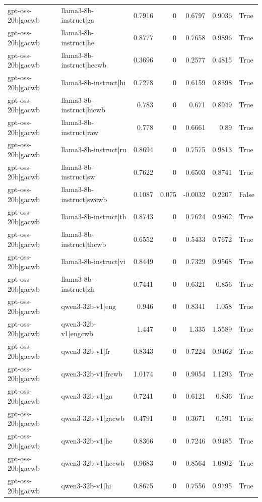 \begin{table}
\begin{tabular}{l l r r r r l}
gpt-oss-20b|gacwb & llama3-8b-instruct|ga & 0.7916 & 0 & 0.6797 & 0.9036 & True \\
gpt-oss-20b|gacwb & llama3-8b-instruct|he & 0.8777 & 0 & 0.7658 & 0.9896 & True \\
gpt-oss-20b|gacwb & llama3-8b-instruct|hecwb & 0.3696 & 0 & 0.2577 & 0.4815 & True \\
gpt-oss-20b|gacwb & llama3-8b-instruct|hi & 0.7278 & 0 & 0.6159 & 0.8398 & True \\
gpt-oss-20b|gacwb & llama3-8b-instruct|hicwb & 0.783 & 0 & 0.671 & 0.8949 & True \\
gpt-oss-20b|gacwb & llama3-8b-instruct|raw & 0.778 & 0 & 0.6661 & 0.89 & True \\
gpt-oss-20b|gacwb & llama3-8b-instruct|ru & 0.8694 & 0 & 0.7575 & 0.9813 & True \\
gpt-oss-20b|gacwb & llama3-8b-instruct|sw & 0.7622 & 0 & 0.6503 & 0.8741 & True \\
gpt-oss-20b|gacwb & llama3-8b-instruct|swcwb & 0.1087 & 0.075 & -0.0032 & 0.2207 & False \\
gpt-oss-20b|gacwb & llama3-8b-instruct|th & 0.8743 & 0 & 0.7624 & 0.9862 & True \\
gpt-oss-20b|gacwb & llama3-8b-instruct|thcwb & 0.6552 & 0 & 0.5433 & 0.7672 & True \\
gpt-oss-20b|gacwb & llama3-8b-instruct|vi & 0.8449 & 0 & 0.7329 & 0.9568 & True \\
gpt-oss-20b|gacwb & llama3-8b-instruct|zh & 0.7441 & 0 & 0.6321 & 0.856 & True \\
gpt-oss-20b|gacwb & qwen3-32b-v1|eng & 0.946 & 0 & 0.8341 & 1.058 & True \\
gpt-oss-20b|gacwb & qwen3-32b-v1|engcwb & 1.447 & 0 & 1.335 & 1.5589 & True \\
gpt-oss-20b|gacwb & qwen3-32b-v1|fr & 0.8343 & 0 & 0.7224 & 0.9462 & True \\
gpt-oss-20b|gacwb & qwen3-32b-v1|frcwb & 1.0174 & 0 & 0.9054 & 1.1293 & True \\
gpt-oss-20b|gacwb & qwen3-32b-v1|ga & 0.7241 & 0 & 0.6121 & 0.836 & True \\
gpt-oss-20b|gacwb & qwen3-32b-v1|gacwb & 0.4791 & 0 & 0.3671 & 0.591 & True \\
gpt-oss-20b|gacwb & qwen3-32b-v1|he & 0.8366 & 0 & 0.7246 & 0.9485 & True \\
gpt-oss-20b|gacwb & qwen3-32b-v1|hecwb & 0.9683 & 0 & 0.8564 & 1.0802 & True \\
gpt-oss-20b|gacwb & qwen3-32b-v1|hi & 0.8675 & 0 & 0.7556 & 0.9795 & True \\

\end{tabular}
\end{table}
